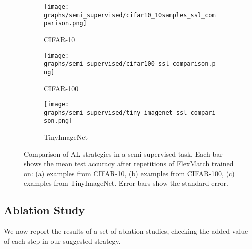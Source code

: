 \documentclass{article}
\begin{document}
\begin{figure}[htb!]
\begin{center}
    \begin{subfigure}{.157\textwidth}
      \centering
      \texttt{[image: graphs/semi\_supervised/cifar10\_10samples\_ssl\_comparison.png]}
    \vspace{-0.65cm}
    \caption{CIFAR-10}
    \label{fig:ssl_cifar_10_with_10_examples}
    \end{subfigure}
    \begin{subfigure}{.157\textwidth}
      \centering
      \texttt{[image: graphs/semi\_supervised/cifar100\_ssl\_comparison.png]}
    \vspace{-0.75cm}
    \caption{CIFAR-100}
    \label{fig:ssl_cifar_100_with_300_examples}
    \end{subfigure}
    \begin{subfigure}{.157\textwidth}
      \centering
      \texttt{[image: graphs/semi\_supervised/tiny\_imagenet\_ssl\_comparison.png]}
    \vspace{-0.75cm}
    \caption{TinyImageNet}
    \label{fig:ssl_tiny_imagenet_with_1000_examples}
    \end{subfigure}
\vspace{-0.35cm}
\caption{Comparison of AL strategies in a semi-supervised task. Each bar shows the mean test accuracy after  repetitions of FlexMatch trained on: (a)  examples from CIFAR-10, (b)  examples from CIFAR-100, (c)  examples from TinyImageNet. Error bars show the standard error. }
\label{fig:semi_supervised}
\vspace{-0.15cm}
\end{center}
\end{figure}



\subsection{Ablation Study}
\label{sec:ablation_study}
We now report the results of a set of ablation studies, checking the added value of each step in our suggested strategy.
\end{document}
